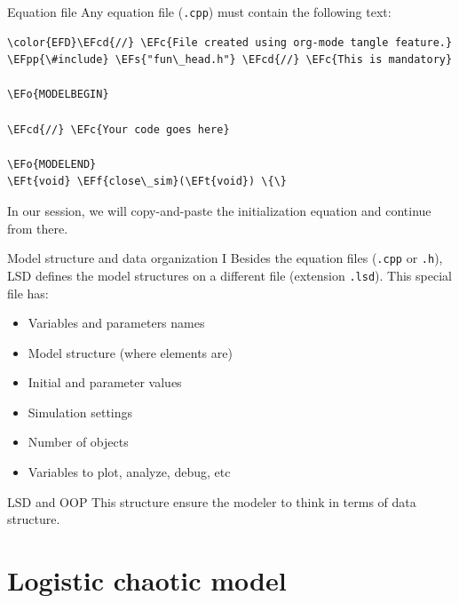 \documentclass[bigger,aspectratio=169]{beamer}
\newcommand{\EFc}[1]{\textcolor{EFc}{#1}} %
\newcommand{\EFcd}[1]{\textcolor{EFcd}{#1}} %
\newcommand{\EFs}[1]{\textcolor{EFs}{#1}} %
\newcommand{\EFf}[1]{\textcolor{EFf}{#1}} %
\newcommand{\EFt}[1]{\textcolor{EFt}{#1}} %
\newcommand{\EFo}[1]{\textcolor{EFo}{#1}} %
\newcommand{\EFpp}[1]{\textcolor{EFpp}{\textbf{#1}}} %
\begin{document}
\begin{frame}[label={sec:org65c426e},fragile]{Equation file}
 Any equation file (\texttt{.cpp}) must contain the following text:
\begin{Code}
\begin{Verbatim}
\color{EFD}\EFcd{//} \EFc{File created using org-mode tangle feature.}
\EFpp{\#include} \EFs{"fun\_head.h"} \EFcd{//} \EFc{This is mandatory}

\EFo{MODELBEGIN}

\EFcd{//} \EFc{Your code goes here}

\EFo{MODELEND}
\EFt{void} \EFf{close\_sim}(\EFt{void}) \{\}
\end{Verbatim}
\end{Code}

In our session, we will copy-and-paste the initialization equation and continue from there.
\end{frame}
\begin{frame}[label={sec:orgdeb2d04},fragile]{Model structure and data organization I}
 Besides the equation files (\texttt{.cpp} or \texttt{.h}), LSD defines the model structures on a different file (extension \texttt{.lsd}).
This special file has:

\begin{itemize}
\item Variables and parameters names
\item Model structure (where elements are)
\item Initial and parameter values
\item Simulation settings
\item Number of objects
\item Variables to plot, analyze, debug, etc
\end{itemize}
\begin{block}{LSD and OOP}
This structure ensure the modeler to think in terms of data structure.
\end{block}
\end{frame}
\section{Logistic chaotic model}
\label{sec:orgf82c075}
\end{document}
